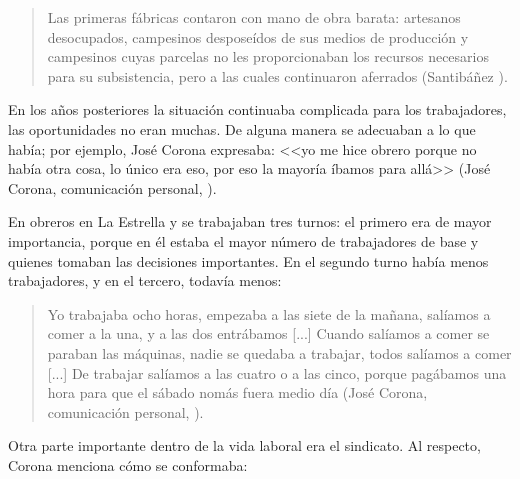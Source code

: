 \documentclass[14pt,letterpaper,twoside]{extbook} %
\begin{document}
\begin{quotation}
\noindent Las primeras fábricas contaron con mano de obra barata: artesanos desocupados, campesinos desposeídos de sus medios de producción y campesinos cuyas parcelas no les proporcionaban los recursos necesarios para su subsistencia, pero a las cuales continuaron aferrados (Santibáñez ).
\end{quotation}

\noindent En los años posteriores la situación continuaba complicada para los trabajadores, las oportunidades no eran muchas. De alguna manera se adecuaban a lo que había; por ejemplo, José Corona expresaba: <<yo me hice obrero porque no había otra cosa, lo único era eso, por eso la
mayoría íbamos para allá>> (José Corona, comunicación personal, ).

En  obreros en La Estrella y se trabajaban tres turnos: el primero era de mayor importancia, porque en él estaba el mayor número de trabajadores de base y quienes tomaban las decisiones importantes. En el segundo turno había menos trabajadores, y en el tercero, todavía menos:

\begin{quotation}
\noindent Yo trabajaba ocho horas, empezaba a las siete de la mañana, salíamos a comer a la una, y a las dos entrábamos [...] Cuando salíamos a comer se paraban las máquinas, nadie se quedaba a trabajar, todos salíamos a comer [...] De trabajar salíamos a las cuatro o a las cinco, porque pagábamos una hora para que el sábado nomás fuera medio día (José Corona, comunicación personal, ).
\end{quotation}

\noindent Otra parte importante dentro de la vida laboral era el sindicato. Al respecto, Corona menciona cómo se conformaba:
\end{document}
